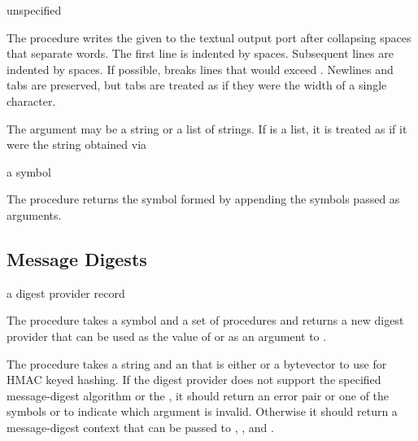 \begin{procedure}
\end{procedure}
\returns{} unspecified

The  procedure writes the given  to the textual output
port  after collapsing spaces that separate words. The first line is
indented by  spaces. Subsequent lines are indented by
 spaces. If possible,  breaks lines that
would exceed . Newlines and tabs are preserved, but tabs are
treated as if they were the width of a single character.

The  argument may be a string or a list of strings. If 
is a list, it is treated as if it were the string obtained via 

\begin{procedure}
\end{procedure}
\returns{} a symbol

The  procedure returns the symbol formed by
appending the symbols passed as arguments.

\subsection {Message Digests}

\begin{procedure}
\end{procedure}
\returns{} a digest provider record

The  procedure takes a symbol 
and a set of procedures and returns a new digest provider that can
be used as the value of  or as an
argument to .

The  procedure takes a string  and an 
that is either  or a bytevector to use for HMAC keyed hashing.
If the digest provider does not support the specified message-digest algorithm
 or the , it should return an error pair or one of
the symbols  or  to indicate which argument
is invalid.
Otherwise it should return a message-digest context that can be
passed to , , and .

